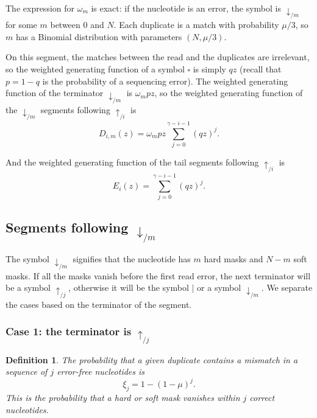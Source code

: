 \documentclass{article}
\newtheorem{definition}{Definition}
\begin{document}
The expression for $\omega_m$ is exact: if the nucleotide is an error,
the symbol is $\downarrow_{/m}$ for some $m$ between 0 and $N$. Each
duplicate is a match with probability $\mu/3$, so $m$ has a Binomial
distribution with parameters $(N, \mu/3)$.

On this segment, the matches between the read and the duplicates are
irrelevant, so the weighted generating function of a symbol $\square$ is
simply $qz$ (recall that $p = 1-q$ is the probability of a sequencing
error). The weighted generating function of the terminator
$\downarrow_{/m}$ is $\omega_m pz$, so the weighted generating function of
the $\downarrow_{/m}$ segments following $\uparrow_{/i}$ is
\begin{equation}
\label{eq:D}
D_{i,m}(z) = \omega_m pz \sum_{j=0}^{\gamma-i-1} (qz)^j.
\end{equation}

And the weighted generating function of the tail segments following
$\uparrow_{/i}$ is
\begin{equation}
\label{eq:E}
E_i(z) = \sum_{j=0}^{\gamma-i-1} (qz)^j.
\end{equation}


\subsection{Segments following $\downarrow_{/m}$}

The symbol $\downarrow_{/m}$ signifies that the nucleotide has $m$ hard
masks and $N-m$ soft masks. If all the masks vanish before the first read
error, the next terminator will be a symbol $\uparrow_{/j}$, otherwise it
will be the symbol $|$ or a symbol $\downarrow_{/m}$. We separate the
cases based on the terminator of the segment.

\subsubsection*{Case 1: the terminator is $\uparrow_{/j}$}

\begin{definition}
The probability that a given duplicate contains a mismatch in a sequence
of $j$ error-free nucleotides is
\begin{equation}
\label{eq:xi}
\xi_j = 1-(1-\mu)^j.
\end{equation}
This is the probability that a hard or soft mask vanishes within $j$
correct nucleotides.
\end{definition}
\end{document}
